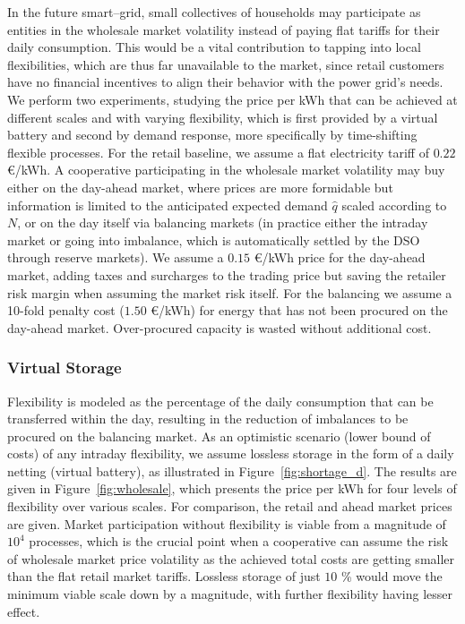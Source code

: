 \documentclass[conference]{IEEEtran}
\begin{document}
In the future smart--grid, small collectives of households may participate as entities in the wholesale market volatility instead of paying flat tariffs for their daily consumption. This would be a vital contribution to tapping into local flexibilities, which are thus far unavailable to the market, since retail customers have no financial incentives to align their behavior with the power grid's needs.
We perform two experiments, studying the price per kWh that can be achieved at different scales and with varying flexibility, which is first provided by a virtual battery and second by demand response, more specifically by time-shifting flexible processes. For the retail baseline, we assume a flat electricity tariff of $0.22$ \euro/kWh. A cooperative participating in the wholesale market volatility may buy either on the day-ahead market, where prices are more formidable but information is limited to the anticipated expected demand $\hat q$ scaled according to $N$, or on the day itself via balancing markets (in practice either the intraday market or going into imbalance, which is automatically settled by the DSO through reserve markets). We assume a $0.15$ \euro/kWh price for the day-ahead market, adding taxes and surcharges to the trading price but saving the retailer risk margin when assuming the market risk itself. For the balancing we assume a 10-fold penalty cost ($1.50$ \euro/kWh) for energy that has not been procured on the day-ahead market. Over-procured capacity is wasted without additional cost.

\subsubsection{Virtual Storage}
Flexibility is modeled as the percentage of the daily consumption that can be transferred within the day, resulting in the reduction of imbalances to be procured on the balancing market. As an optimistic scenario (lower bound of costs) of any intraday flexibility, we assume lossless storage in the form of a daily netting (virtual battery), as illustrated in Figure~\ref{fig:shortage_d}.
The results are given in Figure~\ref{fig:wholesale}, which presents the price per kWh for four levels of flexibility over various scales. For comparison, the retail and ahead market prices are given. Market participation without flexibility is viable from a magnitude of $10^4$ processes, which is the crucial point when a cooperative can assume the risk of wholesale market price volatility as the achieved total costs are getting smaller than the flat retail market tariffs. Lossless storage of just $10$ \% would move the minimum viable scale down by a magnitude, with further flexibility having lesser effect.
\end{document}
